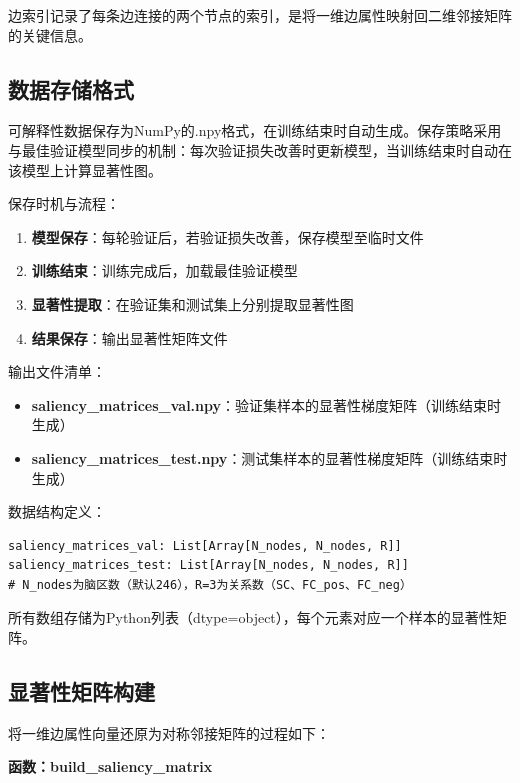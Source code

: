 \documentclass[UTF8, a4paper, 12pt]{article}
\begin{document}
边索引记录了每条边连接的两个节点的索引，是将一维边属性映射回二维邻接矩阵的关键信息。

\subsection{数据存储格式}

可解释性数据保存为NumPy的.npy格式，在训练结束时自动生成。保存策略采用与最佳验证模型同步的机制：每次验证损失改善时更新模型，当训练结束时自动在该模型上计算显著性图。

保存时机与流程：

\begin{enumerate}
    \item \textbf{模型保存}：每轮验证后，若验证损失改善，保存模型至临时文件
    \item \textbf{训练结束}：训练完成后，加载最佳验证模型
    \item \textbf{显著性提取}：在验证集和测试集上分别提取显著性图
    \item \textbf{结果保存}：输出显著性矩阵文件
\end{enumerate}

输出文件清单：

\begin{itemize}
    \item \textbf{saliency\_matrices\_val.npy}：验证集样本的显著性梯度矩阵（训练结束时生成）
    \item \textbf{saliency\_matrices\_test.npy}：测试集样本的显著性梯度矩阵（训练结束时生成）
\end{itemize}

数据结构定义：

\begin{verbatim}
saliency_matrices_val: List[Array[N_nodes, N_nodes, R]]
saliency_matrices_test: List[Array[N_nodes, N_nodes, R]]
# N_nodes为脑区数（默认246），R=3为关系数（SC、FC_pos、FC_neg）
\end{verbatim}

所有数组存储为Python列表（dtype=object），每个元素对应一个样本的显著性矩阵。

\subsection{显著性矩阵构建}

将一维边属性向量还原为对称邻接矩阵的过程如下：

\textbf{函数：build\_saliency\_matrix}
\end{document}
